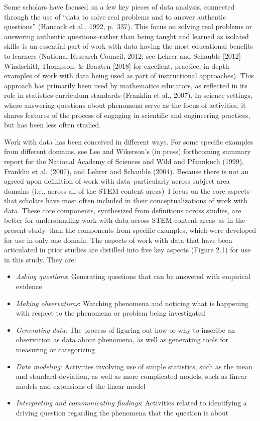 \documentclass[]{msu-thesis}
\providecommand{\tightlist}{%
  \setlength{\itemsep}{0pt}\setlength{\parskip}{0pt}}
\theoremstyle{definition}
\theoremstyle{definition}
\theoremstyle{definition}
\theoremstyle{remark}
\begin{document}
Some scholars have focused on a few key pieces of data analysis,
connected through the use of ``data to solve real problems and to answer
authentic questions'' (Hancock et al., 1992, p.~337). This focus on
solving real problems or answering authentic questions--rather than
being taught and learned as isolated skills--is an essential part of
work with data having the most educational benefits to learners
(National Research Council, 2012; see Lehrer and Schauble {[}2012{]}
Windschitl, Thompson, \& Braaten {[}2018{]} for excellent, practice,
in-depth examples of work with data being used as part of instructional
approaches). This approach has primarily been used by mathematics
educators, as reflected in its role in statistics curriculum standards
(Franklin et al., 2007). In science settings, where answering questions
about phenomena serve as the focus of activities, it shares features of
the process of engaging in scientific and engineering practices, but has
been less often studied.

Work with data has been conceived in different ways. For some specific
examples from different domains, see Lee and Wikerson's (in press)
forthcoming summary report for the National Academy of Sciences and Wild
and Pfannkuch (1999), Franklin et al. (2007), and Lehrer and Schauble
(2004). Because there is not an agreed upon definition of work with
data--particularly across subject area domains (i.e., across all of the
STEM content areas)--I focus on the core aspects that scholars have most
often included in their conceptualizations of work with data. These core
components, synthesized from definitions across studies, are better for
understanding work with data across STEM content areas--as in the
present study--than the components from specific examples, which were
developed for use in only one domain. The aspects of work with data that
have been articulated in prior studies are distilled into five key
aspects (Figure 2.1) for use in this study. They are:

\begin{itemize}
\tightlist
\item
  \emph{Asking questions}: Generating questions that can be answered
  with empirical evidence
\item
  \emph{Making observations}: Watching phenomena and noticing what is
  happening with respect to the phenomena or problem being investigated
\item
  \emph{Generating data}: The process of figuring out how or why to
  inscribe an observation as data about phenomena, as well as generating
  tools for measuring or categorizing
\item
  \emph{Data modeling}: Activities involving use of simple statistics,
  such as the mean and standard deviation, as well as more complicated
  models, such as linear models and extensions of the linear model
\item
  \emph{Interpreting and communicating findings}: Activities related to
  identifying a driving question regarding the phenomena that the
  question is about
\end{itemize}
\end{document}
